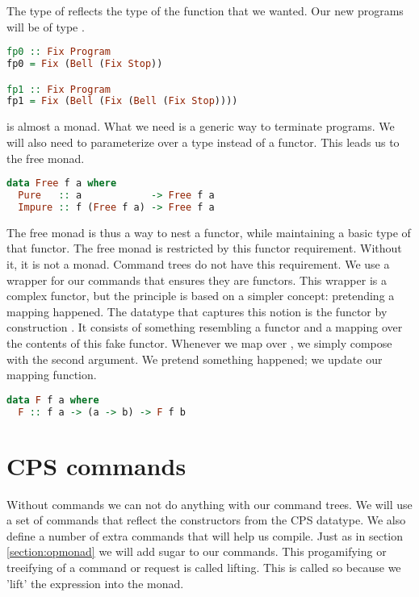 The type of  reflects the type of the function that we wanted. Our new programs will be of type .

\begin{lstlisting}[language=Haskell]
fp0 :: Fix Program
fp0 = Fix (Bell (Fix Stop))

fp1 :: Fix Program
fp1 = Fix (Bell (Fix (Bell (Fix Stop))))
\end{lstlisting}

 is almost a monad. What we need is a generic way to terminate programs. We will also need to parameterize over a type instead of a functor. This leads us to the free monad.

\begin{lstlisting}[language=Haskell]
data Free f a where
  Pure   :: a            -> Free f a
  Impure :: f (Free f a) -> Free f a
\end{lstlisting}

The free monad is thus a way to nest a functor, while maintaining a basic type of that functor. The free monad is restricted by this functor requirement. Without it, it is not a monad. Command trees do not have this requirement. We use a wrapper for our commands that ensures they are functors. This wrapper is a complex functor, but the principle is based on a simpler concept: pretending a mapping happened. The datatype that captures this notion is the functor by construction . It consists of something resembling a functor and a mapping over the contents of this fake functor. Whenever we map over , we simply compose with the second argument. We pretend something happened; we update our mapping function.

\begin{lstlisting}[language=Haskell]
data F f a where
  F :: f a -> (a -> b) -> F f b
\end{lstlisting}

\section{\label{section:cpscommands}CPS commands}
Without commands we can not do anything with our command trees. We will use a set of commands that reflect the constructors from the \ac{CPS} datatype. We also define a number of extra commands that will help us compile. Just as in section \ref{section:opmonad} we will add sugar to our commands. This progamifying or treeifying of a command or request is called lifting. This is called so because we 'lift' the expression into the monad.

